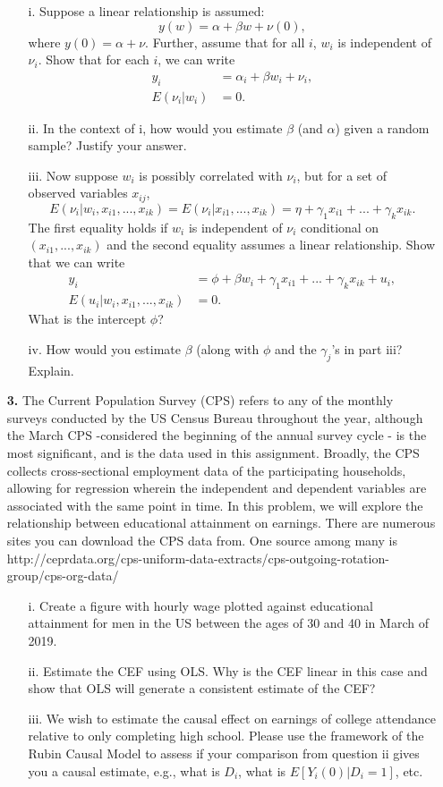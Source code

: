 \documentclass[a4paper]{ctexart}
\theoremstyle{remark}
\begin{document}
\begin{itemize}
\begin{enumerate}
\item[i.] Suppose a linear relationship is assumed:
\[y(w)=\alpha+\beta w+\nu(0),\]
where $y(0)=\alpha+\nu$. Further, assume that for all $i$, $w_i$ is independent of $\nu_i$. Show that for each $i$, we can write
\begin{align*}
y_i&=\alpha_i+\beta w_i+\nu_i,\\
E(\nu_i|w_i)&=0.
\end{align*}
\item[ii.] In the context of i, how would you estimate $\beta$ (and $\alpha$) given a random sample? Justify your answer. 
\item[iii.] Now suppose $w_i$ is possibly correlated with $\nu_i$, but for a set of observed variables $x_{ij}$,
\[E(\nu_i|w_i, x_{i1},...,x_{ik})=E(\nu_i|x_{i1},...,x_{ik})=\eta+\gamma_1 x_{i1}+...+\gamma_k x_{ik}.\]
The first equality holds if $w_i$ is independent of $\nu_i$ conditional on $(x_{i1},...,x_{ik})$ and the second equality assumes a linear relationship. Show that we can write
\begin{align*}
y_i&=\phi+\beta w_i+\gamma_1 x_{i1}+...+\gamma_k x_{ik}+u_i,\\
E(u_i|w_i, x_{i1},...,x_{ik})&=0.
\end{align*}
What is the intercept $\phi$?
\item[iv.]  How would you estimate $\beta$ (along with $\phi$ and the $\gamma_j$'s in part iii? Explain.
\end{enumerate}


\item[\textbf{3.}] The Current Population Survey (CPS) refers to any of the monthly surveys conducted by the US Census Bureau throughout the year, although the March CPS -considered the beginning of the annual survey cycle - is the most significant, and is the data used in this assignment. Broadly, the CPS collects cross-sectional employment data of the participating households, allowing for regression wherein the independent and dependent variables are associated with the same point in time. In this problem, we will explore the relationship between educational attainment on earnings. There are numerous sites you can download the CPS data from. One source among many is http://ceprdata.org/cps-uniform-data-extracts/cps-outgoing-rotation-group/cps-org-data/
\begin{enumerate}
\item[i.] Create a figure with hourly wage plotted against educational attainment for men in the US between the ages of 30 and 40 in March of 2019.
\item[ii.]  Estimate the CEF using OLS. Why is the CEF linear in this case and show that OLS will generate a consistent estimate of the CEF?
\item[iii.]  We wish to estimate the causal effect on earnings of college attendance relative to only completing high school. Please use the framework of the Rubin Causal Model to assess if your comparison from question ii gives you a causal estimate, e.g., what is $D_i$, what is $E[Y_i(0)|D_i = 1]$, etc.
\end{enumerate}



\end{itemize}
\end{document}
